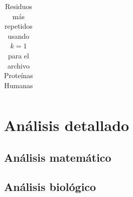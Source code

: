 \begin{table}[h]
\begin{tabular}{|c|r|r|}
\end{tabular}
\caption{Residuos más repetidos usando $k = 1$ para el archivo Proteínas Humanas}
\label{tb:labelr13}
\end{table}


\section{Análisis detallado}

\subsection{Análisis matemático}

\subsection{Análisis biológico}
